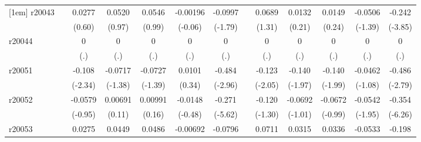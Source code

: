 {\begin{tabular}{l*{12}{c}}
[1em]
r20043      &                     &      0.0277         &      0.0520         &      0.0546         &    -0.00196         &     -0.0997         &                     &      0.0689         &      0.0132         &      0.0149         &     -0.0506         &      -0.242\sym{***}\\
            &                     &      (0.60)         &      (0.97)         &      (0.99)         &     (-0.06)         &     (-1.79)         &                     &      (1.31)         &      (0.21)         &      (0.24)         &     (-1.39)         &     (-3.85)         \\
[1em]
r20044      &                     &           0         &           0         &           0         &           0         &           0         &                     &           0         &           0         &           0         &           0         &           0         \\
            &                     &         (.)         &         (.)         &         (.)         &         (.)         &         (.)         &                     &         (.)         &         (.)         &         (.)         &         (.)         &         (.)         \\
[1em]
r20051      &                     &      -0.108\sym{*}  &     -0.0717         &     -0.0727         &      0.0101         &      -0.484\sym{**} &                     &      -0.123\sym{*}  &      -0.140         &      -0.140         &     -0.0462         &      -0.486\sym{**} \\
            &                     &     (-2.34)         &     (-1.38)         &     (-1.39)         &      (0.34)         &     (-2.96)         &                     &     (-2.05)         &     (-1.97)         &     (-1.99)         &     (-1.08)         &     (-2.79)         \\
[1em]
r20052      &                     &     -0.0579         &     0.00691         &     0.00991         &     -0.0148         &      -0.271\sym{***}&                     &      -0.120         &     -0.0692         &     -0.0672         &     -0.0542         &      -0.354\sym{***}\\
            &                     &     (-0.95)         &      (0.11)         &      (0.16)         &     (-0.48)         &     (-5.62)         &                     &     (-1.30)         &     (-1.01)         &     (-0.99)         &     (-1.95)         &     (-6.26)         \\
[1em]
r20053      &                     &      0.0275         &      0.0449         &      0.0486         &    -0.00692         &     -0.0796         &                     &      0.0711         &      0.0315         &      0.0336         &     -0.0533         &      -0.198\sym{**} \\

\end{tabular}}
